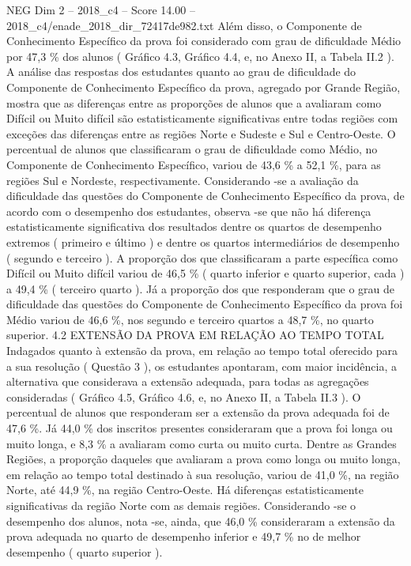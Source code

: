 \begin{textsample}{NEG Dim 2 – 2018\_c4 – Score 14.00 – 2018\_c4/enade\_2018\_dir\_72417de982.txt}
Além disso, o Componente de Conhecimento Específico da prova foi considerado com grau de dificuldade Médio por 47,3 \% dos alunos ( Gráfico 4.3, Gráfico 4.4, e, no Anexo II, a Tabela II.2 ).
A análise das respostas dos estudantes quanto ao grau de dificuldade do Componente de Conhecimento Específico da prova, agregado por Grande Região, mostra que as diferenças entre as proporções de alunos que a avaliaram como Difícil ou Muito difícil são estatisticamente significativas entre todas regiões com exceções das diferenças entre as regiões Norte e Sudeste e Sul e Centro-Oeste.
O percentual de alunos que classificaram o grau de dificuldade como Médio, no Componente de Conhecimento Específico, variou de 43,6 \% a 52,1 \%, para as regiões Sul e Nordeste, respectivamente.
Considerando -se a avaliação da dificuldade das questões do Componente de Conhecimento Específico da prova, de acordo com o desempenho dos estudantes, observa -se que não há diferença estatisticamente significativa dos resultados dentre os quartos de desempenho extremos ( primeiro e último ) e dentre os quartos intermediários de desempenho ( segundo e terceiro ).
A proporção dos que classificaram a parte específica como Difícil ou Muito difícil variou de 46,5 \% ( quarto inferior e quarto superior, cada ) a 49,4 \% ( terceiro quarto ).
Já a proporção dos que responderam que o grau de dificuldade das questões do Componente de Conhecimento Específico da prova foi Médio variou de 46,6 \%, nos segundo e terceiro quartos a 48,7 \%, no quarto superior. 4.2 EXTENSÃO DA PROVA EM RELAÇÃO AO TEMPO TOTAL Indagados quanto à extensão da prova, em relação ao tempo total oferecido para a sua resolução ( Questão 3 ), os estudantes apontaram, com maior incidência, a alternativa que considerava a extensão adequada, para todas as agregações consideradas ( Gráfico 4.5, Gráfico 4.6, e, no Anexo II, a Tabela II.3 ).
O percentual de alunos que responderam ser a extensão da prova adequada foi de 47,6 \%.
Já 44,0 \% dos inscritos presentes consideraram que a prova foi longa ou muito longa, e 8,3 \% a avaliaram como curta ou muito curta.
Dentre as Grandes Regiões, a proporção daqueles que avaliaram a prova como longa ou muito longa, em relação ao tempo total destinado à sua resolução, variou de 41,0 \%, na região Norte, até 44,9 \%, na região Centro-Oeste.
Há diferenças estatisticamente significativas da região Norte com as demais regiões.
Considerando -se o desempenho dos alunos, nota -se, ainda, que 46,0 \% consideraram a extensão da prova adequada no quarto de desempenho inferior e 49,7 \% no de melhor desempenho ( quarto superior ).

\end{textsample}
